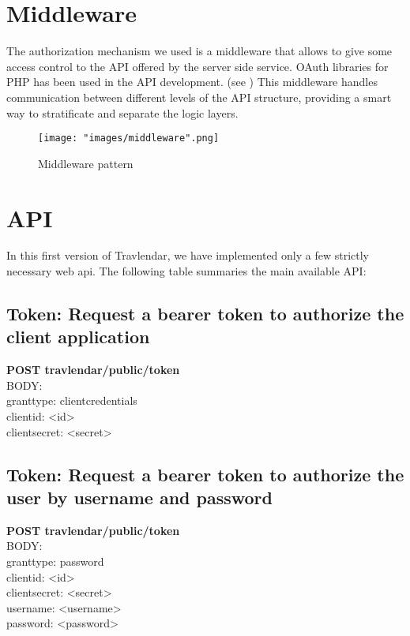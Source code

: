 \section{Middleware}
The authorization mechanism we used is a middleware that allows to give some access control to the API offered by the server side service. OAuth libraries for PHP has been used in the API development. (see ) This middleware handles communication between different levels of the API structure, providing a smart way to stratificate and separate the logic layers.

\begin{figure}[H]
\begin{center}
\texttt{[image: "images/middleware".png]}
\caption{Middleware pattern}
\end{center}
\end{figure}


\section{API}
In this first version of Travlendar, we have implemented only a few strictly necessary web api. The following table summaries the main available API:

\subsection{Token: Request a bearer token to authorize the client application}
\textbf{POST travlendar/public/token}\\
BODY:\\
grant\textunderscore type: client\textunderscore credentials\\
client\textunderscore id: <id>\\
client\textunderscore secret: <secret>\\

\subsection{Token: Request a bearer token to authorize the user by username and password}
\textbf{POST travlendar/public/token}\\
BODY:\\
grant\textunderscore type: password\\
client\textunderscore id: <id>\\
client\textunderscore secret: <secret>\\
username: <username>\\
password: <password>\\

